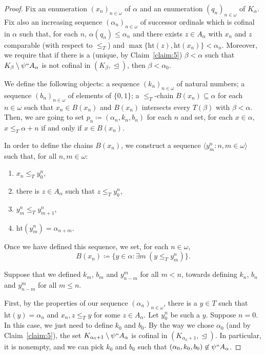 \documentclass[]{amsart}
\theoremstyle{definition}
\theoremstyle{remark}
\begin{document}
\begin{proof}
Fix an enumeration $(x_n)_{n\in\omega}$ of $\alpha$ and an enumeration $(q_n)_{n\in\omega}$ of $K_\alpha$. Fix also an increasing sequence $(\alpha_n)_{n\in\omega}$ of successor ordinals which is cofinal in $\alpha$ such that, for each $n$, $\alpha(q_n) \le \alpha_n$ and there exists $z \in A_\alpha$ with $x_n$ and  $z$ comparable (with respect to $\le_T$) and $\max\{\mathrm{ht}(z), \mathrm{ht}(x_n)\} < \alpha_n$. Moreover, we require that if there is a (unique, by Claim~\ref{claim:5}) $\beta < \alpha$ such that $K_\beta \setminus \psi`` A_\alpha$ is not cofinal in $(K_\beta, \trianglelefteq)$, then $\beta < \alpha_0$.



We define the following objects: a sequence $(k_n)_{n\in\omega}$ of natural numbers; a sequence $(b_n)_{n\in\omega}$ of elements of $\{0,1\}$; a $\le_T$-chain $B(x_n) \subseteq \alpha$ for each $n\in\omega$ such that $x_n \in B(x_n)$ and $B(x_n)$ intersects every $T(\beta)$ with $\beta < \alpha$. Then, we are going to set $p_n \coloneqq (\alpha_n, k_n, b_n)$ for each $n$ and set, for each $x \in \alpha$, $x \le_T \alpha+n$ if and only if $x \in B(x_n)$.



In order to define the chains $B(x_n)$, we construct a sequence $\langle y^n_m : n,m\in\omega\rangle$ such that, for all $n,m \in \omega$:
\begin{enumerate}[label = (\alph*)]
\item $x_n \le_T y^n_0$,
\item there is $z \in A_\alpha$ such that $z \le_T y_0^n$,
\item $y^n_m \le_T y^n_{m+1}$,
\item $\mathrm{ht}(y^n_m) = \alpha_{n+m}$.
\end{enumerate}

Once we have defined this sequence, we set, for each $n \in \omega$, 
\begin{equation}\label{eq:main4:defbranch}
B(x_n) \coloneqq \{y \in \alpha : \exists m \ (y \le_T y^n_m)\}.
\end{equation}

Suppose that we defined $k_m$, $b_m$ and $y^m_{n-m}$ for all $m < n$, towards defining $k_{n}$, $b_{n}$ and $y^m_{n-m}$ for all $m \le n$. 

First, by the properties of our sequence $(\alpha_n)_{n\in\omega}$, there is a $y \in T$ such that $\mathrm{ht}(y) = \alpha_{n}$ and $x_{n}, z \le_T y$ for some $z \in A_\alpha$. Let $y_0^{n}$ be such a $y$. Suppose $n =0$. In this case, we just need to define $k_0$ and $b_0$. By the way we chose $\alpha_0$ (and by Claim~\ref{claim:5}), the set $K_{\alpha_{0}+1} \setminus \psi`` A_\alpha$ is cofinal in $(K_{\alpha_{0}+1}, \trianglelefteq)$. In particular, it is nonempty, and  we can pick $k_{0}$ and $b_{0}$ such that $(\alpha_{0}, k_{0}, b_{0}) \not\in \psi`` A_\alpha$.  



\end{proof}
\end{document}
